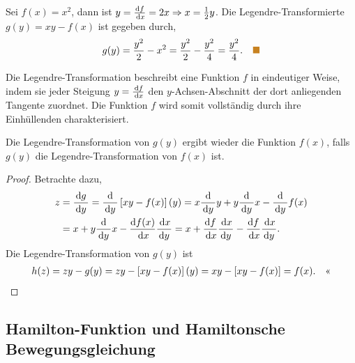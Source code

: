 \begin{bsp}
Sei $f(x) = x^2$, dann ist $y=\frac{\diffd f}{\dx} = 2x\Rightarrow
x=\frac{1}{2}y$. Die Legendre-Transformierte $g(y)=xy-f(x)$ ist gegeben durch,
\begin{align*}
g(y) = \frac{y^2}{2} - x^2 = \frac{y^2}{2} - \frac{y^2}{4} =
\frac{y^2}{4}.\bsphere
\end{align*}
\end{bsp}

\begin{bemn}
Die Legendre-Transformation beschreibt eine Funktion $f$ in eindeutiger
Weise, indem sie jeder Steigung $y=\frac{\df}{\dx}$ den $y$-Achsen-Abschnitt der dort
anliegenden Tangente zuordnet. Die Funktion $f$ wird somit vollständig durch ihre
Einhüllenden charakterisiert.\maphere
\end{bemn}

\begin{propn}[Theorem]
Die Legendre-Transformation von $g(y)$ ergibt wieder die Funktion $f(x)$, falls
$g(y)$ die Legendre-Transformation von $f(x)$ ist.\fishhere
\end{propn}
\begin{proof}
Betrachte dazu,
\begin{align*}
z &= \frac{\diffd g}{\dy} = \frac{\diffd}{\dy}\left[ xy-f(x) \right](y)
= x \frac{\diffd }{\dy}y + y \frac{\diffd}{\dy}x  - \frac{\diffd}{\dy}f(x)
\\ &= x + y\frac{\diffd}{\dy}x - \frac{\diffd f(x)}{\dx}\frac{\dx}{\dy}
= x + \frac{\diffd f}{\dx}\frac{\dx}{\dy} - \frac{\diffd
f}{\dx}\frac{\dx}{\dy}.
\end{align*}
Die Legendre-Transformation von $g(y)$ ist
\begin{align*}
h(z) = zy - g(y) = zy-\left[xy-f(x)\right](y) = 
xy - \left[xy-f(x)\right] = f(x).\qedhere
\end{align*}
\end{proof}

\subsection{Hamilton-Funktion und Hamiltonsche Bewegungsgleichung}

